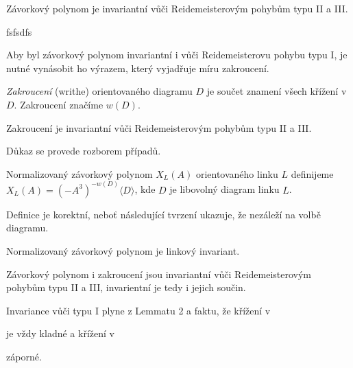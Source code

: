 \begin{tvrz}\label{t01:3}
Závorkový polynom je invariantní vůči Reidemeisterovým pohybům typu II a III.
\end{tvrz}
\begin{dukaz}
fsfsdfs
\end{dukaz}

Aby byl závorkový polynom invariantní i vůči Reidemeisterovu pohybu typu I, je nutné vynásobit ho výrazem, který vyjadřuje míru zakroucení.

\begin{definice}\label{def01:3}
\emph{Zakroucení} (writhe) orientovaného diagramu $D$ je součet znamení všech křížení v $D$. Zakroucení značíme $w(D)$.
\end{definice}

\begin{lemma}\label{l01:4}
Zakroucení je invariantní vůči Reidemeisterovým pohybům typu II a III.
\end{lemma}
\begin{dukaz}
Důkaz se provede rozborem případů.
\end{dukaz}

\begin{definice}\label{def01:4}
Normalizovaný závorkový polynom $X_L(A)$ orientovaného linku $L$ definijeme $X_L(A) = (-A^3)^{-w(D)}\langle D \rangle$, kde $D$ je libovolný diagram linku $L$.
\end{definice}

Definice je korektní, neboť následující tvrzení ukazuje, že nezáleží na volbě diagramu.

\begin{tvrz}\label{t01:5}
Normalizovaný závorkový polynom je linkový invariant.
\end{tvrz}
\begin{dukaz}
Závorkový polynom i zakroucení jsou invariantní vůči Reidemeisterovým pohybům typu II a III, invarientní je tedy i jejich součin.

Invariance vůči typu I plyne z Lemmatu 2 a faktu, že křížení v  
je vždy kladné a křížení v 
 záporné.
\end{dukaz}

